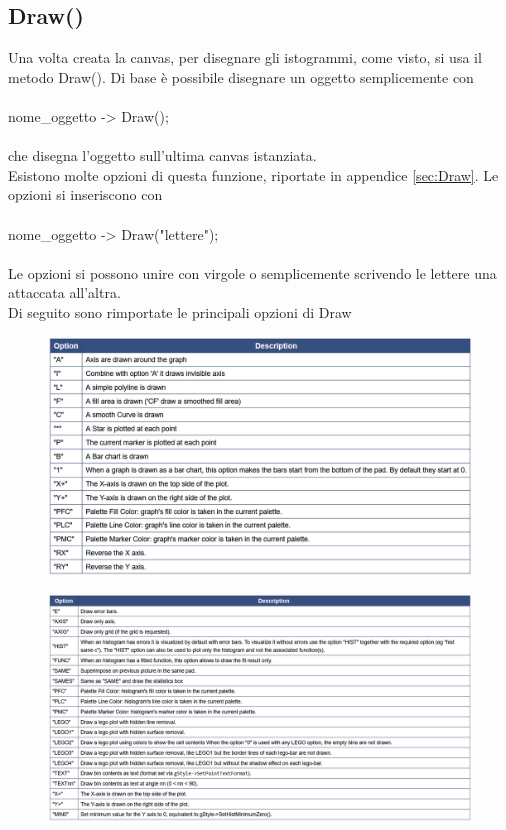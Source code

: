 \documentclass[10pt,a4paper]{article}
\begin{document}
\subsection{Draw()}
Una volta creata la canvas, per disegnare gli istogrammi, come visto, si usa il metodo Draw(). Di base è possibile disegnare un oggetto semplicemente con\\\\
nome\_oggetto -> Draw();\\\\ 
che disegna l'oggetto sull'ultima canvas istanziata.\\
Esistono molte opzioni di questa funzione, riportate in appendice \ref{sec:Draw}. Le opzioni si inseriscono con\\\\
nome\_oggetto -> Draw("lettere");\\\\
Le opzioni si possono unire con virgole o semplicemente scrivendo le lettere una attaccata all'altra.\\
Di seguito sono rimportate le principali opzioni di Draw
\begin{figure}[h!]
	\centering
	\includegraphics[width=1.\linewidth]{"Screenshot 2022-06-04 221503"}
\end{figure}
\FloatBarrier
\begin{figure}[h!]
	\centering
	\includegraphics[width=1.\linewidth]{"Screenshot 2022-06-04 222020"}
\end{figure}
\end{document}
